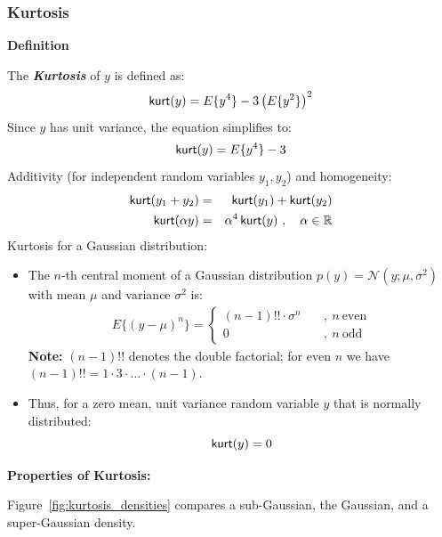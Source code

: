 \subsubsection{Kurtosis}\label{sec:ica_kurtosis}

\textbf{Definition}
 
   The \textbf {\textit{Kurtosis}} of $y$ is defined as:
    \begin{displaymath}
      \mathop{\mathsf{kurt}}(y) = E \{ y^4 \} - 3 \left( E\{ y^2 \} \right)^2
    \end{displaymath}
%    
    Since $y$ has unit variance, the equation simplifies to:
    \begin{displaymath}
      \mathop{\mathsf{kurt}}(y) = E \{ y^4 \} - 3
    \end{displaymath}    
    Additivity (for independent random variables $y_1, y_2$) and homogeneity:
    \begin{eqnarray*}
      \mathop{\mathsf{kurt}}(y_1 + y_2) &=& \mathop{\mathsf{kurt}}(y_1) + \mathop{\mathsf{kurt}}(y_2) \\
      \mathop{\mathsf{kurt}}(\alpha y) &=& \alpha^4 \mathop{\mathsf{kurt}}(y) ~, \quad \alpha \in \mathbb{R}
    \end{eqnarray*}
Kurtosis for a Gaussian distribution:
  
  \begin{itemize}
    \item The $n$-th central moment of a Gaussian distribution $p(y) = {\mathcal{N}}(y ; \mu, \sigma^2)$ with mean $\mu$ and variance $\sigma^2$ is:
      \begin{eqnarray*}
        E \{ (y - \mu)^n \} = \begin{cases}
                                (n-1) !! \cdot \sigma^n \quad &, ~n~ \mbox{even} \\
                                0 \quad &, ~n~ \mbox{odd}
                              \end{cases}
      \end{eqnarray*}
     \textbf{Note:}
      $(n-1)!!$ denotes the double factorial; for even $n$ we have $(n-1)!! = 1\cdot 3\cdot \dots \cdot (n-1)$.
    \item Thus, for a zero mean, unit variance random variable $y$ that is normally distributed:
      \begin{displaymath}
        \mathop{\mathsf{kurt}}(y) = 0
      \end{displaymath}
  \end{itemize}
 \textbf {Properties of Kurtosis:}

Figure~\ref{fig:kurtosis_densities} compares a sub-Gaussian, the Gaussian, and a super-Gaussian density.

